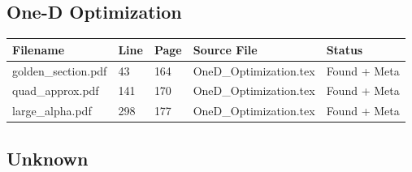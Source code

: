 \documentclass[11pt]{article}
\begin{document}
\subsection{One-D Optimization}



\begin{longtable}{|p{3.5cm}|p{1.5cm}|p{1cm}|p{4cm}|p{2cm}|}
\hline
\textbf{Filename} & \textbf{Line} & \textbf{Page} & \textbf{Source File} & \textbf{Status} \\
\hline
\endhead

golden\_section.pdf & 43 & 164 & OneD\_Optimization.tex & \textcolor{found}{Found + Meta} \\
\hline

quad\_approx.pdf & 141 & 170 & OneD\_Optimization.tex & \textcolor{found}{Found + Meta} \\
\hline

large\_alpha.pdf & 298 & 177 & OneD\_Optimization.tex & \textcolor{found}{Found + Meta} \\
\hline

\end{longtable}


\subsection{Unknown}
\end{document}
